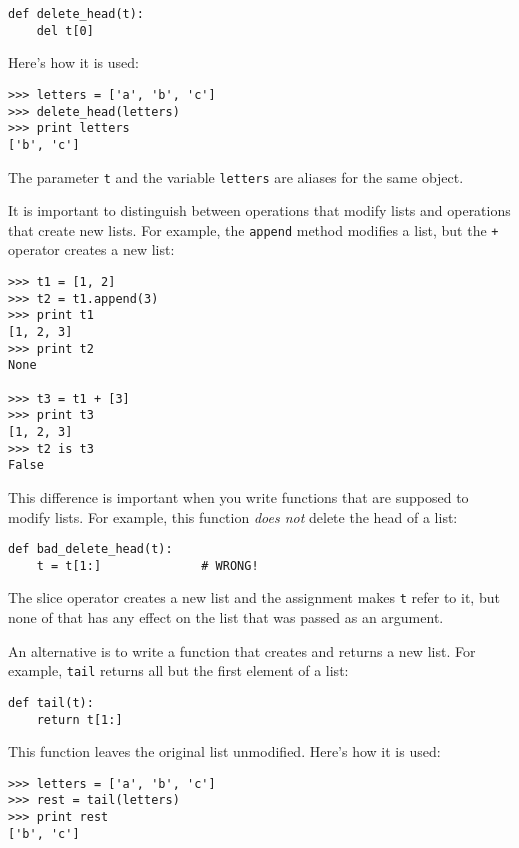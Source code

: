 \beforeverb
\begin{verbatim}
def delete_head(t):
    del t[0]
\end{verbatim}
\afterverb
%
Here's how it is used:

\beforeverb
\begin{verbatim}
>>> letters = ['a', 'b', 'c']
>>> delete_head(letters)
>>> print letters
['b', 'c']
\end{verbatim}
\afterverb
%
The parameter {\tt t} and the variable {\tt letters} are
aliases for the same object.  

It is important to distinguish between operations that
modify lists and operations that create new lists.  For
example, the {\tt append} method modifies a list, but the
{\tt +} operator creates a new list:


\beforeverb
\begin{verbatim}
>>> t1 = [1, 2]
>>> t2 = t1.append(3)
>>> print t1
[1, 2, 3]
>>> print t2
None

>>> t3 = t1 + [3]
>>> print t3
[1, 2, 3]
>>> t2 is t3
False
\end{verbatim}
\afterverb

This difference is important when you write functions that
are supposed to modify lists.  For example, this function
\emph{does not} delete the head of a list:

\beforeverb
\begin{verbatim}
def bad_delete_head(t):
    t = t[1:]              # WRONG!
\end{verbatim}
\afterverb

The slice operator creates a new list and the assignment
makes {\tt t} refer to it, but none of that has any effect
on the list that was passed as an argument.


An alternative is to write a function that creates and
returns a new list.  For
example, {\tt tail} returns all but the first
element of a list:

\beforeverb
\begin{verbatim}
def tail(t):
    return t[1:]
\end{verbatim}
\afterverb
%
This function leaves the original list unmodified.
Here's how it is used:

\beforeverb
\begin{verbatim}
>>> letters = ['a', 'b', 'c']
>>> rest = tail(letters)
>>> print rest
['b', 'c']
\end{verbatim}
\afterverb


